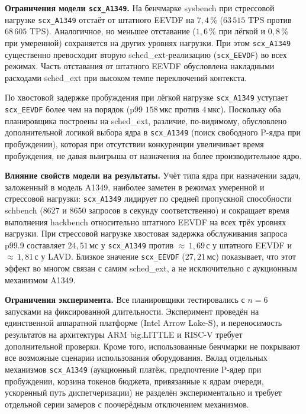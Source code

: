 \documentclass[14pt, oneside]{extbook}
\begin{document}
        \textbf{Ограничения модели \texttt{scx\_A1349}.}
        На бенчмарке sysbench при стрессовой нагрузке
        \texttt{scx\_A1349} отстаёт от штатного EEVDF на
        $7{,}4$\,\% ($63\,515$ TPS против $68\,605$ TPS).
        Аналогичное, но меньшее отставание ($1{,}6$\,\% при
        лёгкой и $0{,}8$\,\% при умеренной) сохраняется на
        других уровнях нагрузки.
        При этом \texttt{scx\_A1349} существенно превосходит
        вторую sched\_ext-реализацию (\texttt{scx\_EEVDF}) во
        всех режимах. Часть отставания от штатного EEVDF
        обусловлена накладными расходами sched\_ext при
        высоком темпе переключений контекста.

        По хвостовой задержке пробуждения при лёгкой нагрузке
        \texttt{scx\_A1349} уступает \texttt{scx\_EEVDF}
        более чем на порядок (p99 $158$\,мкс против $4$\,мкс).
        Поскольку оба планировщика построены на sched\_ext,
        различие, по-видимому, обусловлено дополнительной
        логикой выбора ядра в \texttt{scx\_A1349} (поиск
        свободного P-ядра при пробуждении), которая при
        отсутствии конкуренции увеличивает время пробуждения,
        не давая выигрыша от назначения на более производительное
        ядро.

        \textbf{Влияние свойств модели на результаты.}
        Учёт типа ядра при назначении задач, заложенный в
        модель A1349, наиболее заметен в режимах умеренной и
        стрессовой нагрузки: \texttt{scx\_A1349} лидирует по
        средней пропускной способности schbench ($8627$ и
        $8650$ запросов в секунду соответственно) и сокращает
        время выполнения hackbench относительно штатного EEVDF
        на всех трёх уровнях нагрузки. При стрессовой нагрузке
        хвостовая задержка обслуживания запроса p99.9 составляет
        $24{,}51$\,мс у \texttt{scx\_A1349} против
        $\approx$\,$1{,}69$\,с у штатного EEVDF и
        $\approx$\,$1{,}81$\,с у LAVD. Близкое значение
        \texttt{scx\_EEVDF} ($27{,}21$\,мс) показывает, что
        этот эффект во многом связан с самим sched\_ext, а не
        исключительно с аукционным механизмом A1349.

        \textbf{Ограничения эксперимента.}
        Все планировщики тестировались с $n = 6$ запусками на
        фиксированной длительности. Эксперимент проведён на
        единственной аппаратной платформе (Intel Arrow Lake-S),
        и переносимость результатов на архитектуры ARM
        big.LITTLE и RISC-V требует дополнительной проверки.
        Кроме того, использованные бенчмарки не покрывают
        все возможные сценарии использования оборудования.
        Вклад отдельных механизмов \texttt{scx\_A1349}
        (аукционный платёж, предпочтение P-ядер при
        пробуждении, корзина токенов бюджета, привязанные
        к ядрам очереди, ускоренный путь диспетчеризации)
        не разделён экспериментально и требует отдельной
        серии замеров с поочерёдным отключением механизмов.
\end{document}
